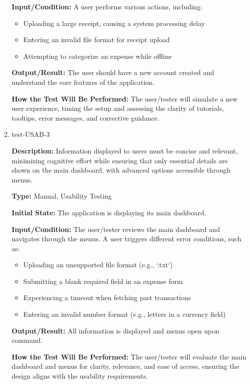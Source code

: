\documentclass[12pt, titlepage]{article}
\begin{document}
\begin{enumerate}
\textbf{Input/Condition:} A user performs various actions, including:
  \begin{itemize}
      \item Uploading a large receipt, causing a system processing delay
      \item Entering an invalid file format for receipt upload
      \item Attempting to categorize an expense while offline
  \end{itemize}
					
\textbf{Output/Result:} The user should have a new account created and
understand the core features of the application.
					
\textbf{How the Test Will Be Performed:} The user/tester will simulate a new
user experience, timing the setup and assessing the clarity of tutorials,
tooltips, error messages, and corrective guidance.

\item{test-USAB-3\\}

\textbf{Description:} Information displayed to users must be concise and
relevant, minimizing cognitive effort while ensuring that only essential details
are shown on the main dashboard, with advanced options accessible through menus.

\textbf{Type:} Manual, Usability Testing
					
\textbf{Initial State:} The application is displaying its main dashboard.
					
\textbf{Input/Condition:} The user/tester reviews the main dashboard and
navigates through the menus. A user triggers different error conditions, such as:
  \begin{itemize}
      \item Uploading an unsupported file format (e.g., `.txt`)
      \item Submitting a blank required field in an expense form
      \item Experiencing a timeout when fetching past transactions
      \item Entering an invalid number format (e.g., letters in a currency field)
  \end{itemize}
					
\textbf{Output/Result:} All information is displayed and menus open upon
command.
					
\textbf{How the Test Will Be Performed:} The user/tester will evaluate the main
dashboard and menus for clarity, relevance, and ease of access, ensuring the
design aligns with the usability requirements.


\end{enumerate}
\end{document}
